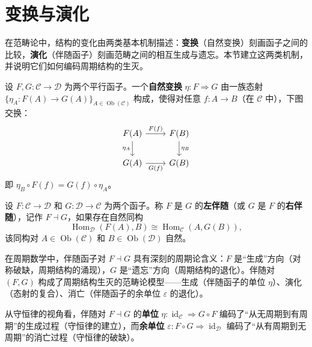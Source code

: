 \section{变换与演化}\label{sec:transformation_evolution}

在范畴论中，结构的变化由两类基本机制描述：\textbf{变换}（自然变换）刻画函子之间的比较，\textbf{演化}（伴随函子）刻画范畴之间的相互生成与遗忘。本节建立这两类机制，并说明它们如何编码周期结构的生灭。

\begin{definition}[自然变换]\label{def:natural_transformation}
设 $F, G: \mathcal{C} \to \mathcal{D}$ 为两个平行函子。一个\textbf{自然变换} $\eta: F \Rightarrow G$ 由一族态射 $\{\eta_A: F(A) \to G(A)\}_{A \in \operatorname{Ob}(\mathcal{C})}$ 构成，使得对任意 $f: A \to B$（在 $\mathcal{C}$ 中），下图交换：
\[
\begin{tikzcd}
F(A) \arrow[r, "F(f)"] \arrow[d, "\eta_A"'] & F(B) \arrow[d, "\eta_B"] \\
G(A) \arrow[r, "G(f)"'] & G(B)
\end{tikzcd}
\]
即 $\eta_B \circ F(f) = G(f) \circ \eta_A$。
\end{definition}

\begin{definition}[伴随函子]\label{def:adjoint_functor}
设 $F: \mathcal{C} \to \mathcal{D}$ 和 $G: \mathcal{D} \to \mathcal{C}$ 为两个函子。称 $F$ 是 $G$ 的\textbf{左伴随}（或 $G$ 是 $F$ 的\textbf{右伴随}），记作 $F \dashv G$，如果存在自然同构
\[
\operatorname{Hom}_{\mathcal{D}}(F(A), B) \cong \operatorname{Hom}_{\mathcal{C}}(A, G(B)),
\]
该同构对 $A \in \operatorname{Ob}(\mathcal{C})$ 和 $B \in \operatorname{Ob}(\mathcal{D})$ 自然。
\end{definition}

\begin{remark}[伴随函子与周期生灭]\label{rem:adjunction_periodic_lifecycle}
在周期数学中，伴随函子对 $F \dashv G$ 具有深刻的周期论含义：$F$ 是“生成”方向（对称破缺，周期结构的涌现），$G$ 是“遗忘”方向（周期结构的退化）。伴随对 $(F, G)$ 构成了周期结构生灭的范畴论模型——生成（伴随函子的单位 $\eta$）、演化（态射的复合）、消亡（伴随函子的余单位 $\varepsilon$ 的退化）。

从守恒律的视角看，伴随对 $F \dashv G$ 的\textbf{单位} $\eta: \operatorname{id}_{\mathcal{C}} \Rightarrow G \circ F$ 编码了“从无周期到有周期”的生成过程（守恒律的建立），而\textbf{余单位} $\varepsilon: F \circ G \Rightarrow \operatorname{id}_{\mathcal{D}}$ 编码了“从有周期到无周期”的消亡过程（守恒律的破缺）。
\end{remark}

